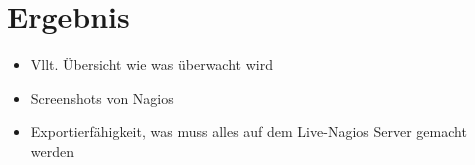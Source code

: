 \section{Ergebnis}

\begin{itemize}
\item Vllt. Übersicht wie was überwacht wird
\item Screenshots von Nagios
\item Exportierfähigkeit, was muss alles auf dem Live-Nagios Server gemacht werden
\end{itemize}